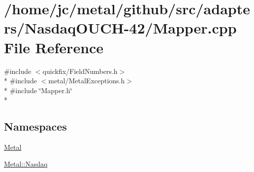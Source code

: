\hypertarget{adapters_2NasdaqOUCH-42_2Mapper_8cpp}{}\section{/home/jc/metal/github/src/adapters/\+Nasdaq\+O\+U\+C\+H-\/42/\+Mapper.cpp File Reference}
\label{adapters_2NasdaqOUCH-42_2Mapper_8cpp}
{\ttfamily \#include $<$quickfix/\+Field\+Numbers.\+h$>$}\\*
{\ttfamily \#include $<$metal/\+Metal\+Exceptions.\+h$>$}\\*
{\ttfamily \#include \char`\"{}Mapper.\+h\char`\"{}}\\*
\subsection*{Namespaces}
\begin{DoxyCompactItemize}
\item 
 \hyperlink{namespaceMetal}{Metal}
\item 
 \hyperlink{namespaceMetal_1_1Nasdaq}{Metal\+::\+Nasdaq}
\end{DoxyCompactItemize}
